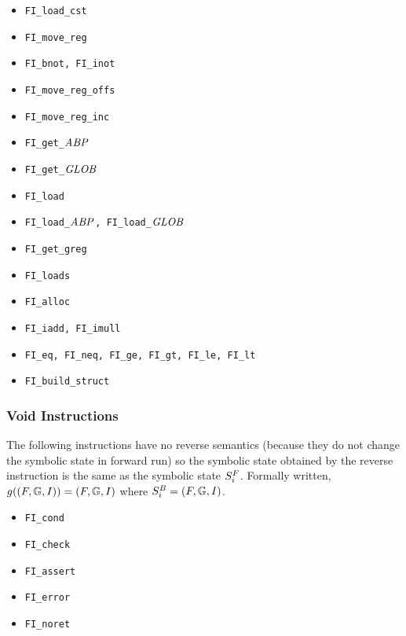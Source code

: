 \begin{itemize}

	\item {\tt FI\_load\_cst}

	\item {\tt FI\_move\_reg}

	\item {\tt FI\_bnot, FI\_inot}

	\item {\tt FI\_move\_reg\_offs}

	\item {\tt FI\_move\_reg\_inc}

	\item {\tt FI\_get\_$\mathit{ABP}$}

	\item {\tt FI\_get\_$\mathit{GLOB}$}

	\item {\tt FI\_load}
	
	\item {\tt FI\_load\_$\mathit{ABP}$, FI\_load\_$\mathit{GLOB}$}
	
	\item {\tt FI\_get\_greg}
	
	\item {\tt FI\_loads}
	
	\item {\tt FI\_alloc}

	\item {\tt FI\_iadd, FI\_imull}

	\item {\tt FI\_eq, FI\_neq, FI\_ge, FI\_gt, FI\_le, FI\_lt}
	
	\item {\tt FI\_build\_struct}

\end{itemize}

\subsubsection{Void Instructions}
The following instructions have no reverse semantics
(because they do not change the symbolic state in forward run)
so the symbolic state obtained by the reverse instruction
is the same as the symbolic state $S^{F}_{i}$.
Formally written, $g((F, \mathbb{G}, I)) = (F, \mathbb{G}, I)$ where $S^{B}_{i} = (F, \mathbb{G}, I)$.

\begin{itemize}
	
	\item {\tt FI\_cond}
	
	\item {\tt FI\_check}
	
	\item {\tt FI\_assert}
	
	\item {\tt FI\_error}
	
	\item {\tt FI\_noret}

\end{itemize}


